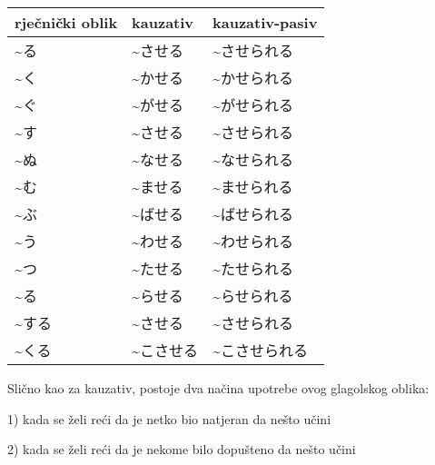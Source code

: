 	\begin{table}[h]
		\centering
		\begin{tabular}{l l l}\toprule[2pt]
			rječnički oblik & kauzativ & kauzativ-pasiv\\
			\midrule
			\textasciitilde る & \textasciitilde させる & \textasciitilde させられる\\
			\textasciitilde く & \textasciitilde かせる & \textasciitilde かせられる\\
			\textasciitilde ぐ & \textasciitilde がせる & \textasciitilde がせられる\\
			\textasciitilde す & \textasciitilde させる & \textasciitilde させられる\\
			\textasciitilde ぬ & \textasciitilde なせる & \textasciitilde なせられる\\
			\textasciitilde む & \textasciitilde ませる & \textasciitilde ませられる\\
			\textasciitilde ぶ & \textasciitilde ばせる & \textasciitilde ばせられる\\
			\textasciitilde う & \textasciitilde わせる & \textasciitilde わせられる\\
			\textasciitilde つ & \textasciitilde たせる & \textasciitilde たせられる\\
			\textasciitilde る & \textasciitilde らせる & \textasciitilde らせられる\\
			\textasciitilde する　& \textasciitilde させる & \textasciitilde させられる\\
			\textasciitilde くる　&\textasciitilde こさせる & \textasciitilde こさせられる\\
			\bottomrule[2pt]
		\end{tabular}
	\end{table}
	

	Slično kao za kauzativ, postoje dva načina upotrebe ovog glagolskog oblika:
	
	1) kada se želi reći da je netko bio natjeran da nešto učini
	
	2) kada se želi reći da je nekome bilo dopušteno da nešto učini
 
	\begin{reibun}
	\end{reibun}

